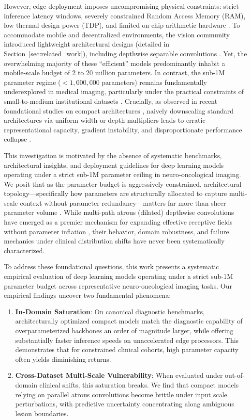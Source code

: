 However, edge deployment imposes uncompromising physical constraints: strict inference latency windows, severely constrained Random Access Memory (RAM), low thermal design power (TDP), and limited on-chip arithmetic hardware \cite{9, 25}. To accommodate mobile and decentralized environments, the vision community introduced lightweight architectural designs \cite{22} (detailed in Section~\ref{sec:related_work}), including depthwise separable convolutions \cite{11, 27}. Yet, the overwhelming majority of these ``efficient'' models predominantly inhabit a mobile-scale budget of 2 to 20 million parameters. In contrast, the sub-1M parameter regime ($<1,000,000$ parameters) remains fundamentally underexplored in medical imaging, particularly under the practical constraints of small-to-medium institutional datasets \cite{3, 16}. Crucially, as observed in recent foundational studies on compact architectures \cite{16}, naively downscaling standard architectures via uniform width or depth multipliers leads to erratic representational capacity, gradient instability, and disproportionate performance collapse \cite{16, 19}.

This investigation is motivated by the absence of systematic benchmarks, architectural insights, and deployment guidelines for deep learning models operating under a strict sub-1M parameter ceiling in neuro-oncological imaging. We posit that as the parameter budget is aggressively constrained, architectural topology---specifically how parameters are structurally allocated to capture multi-scale context without parameter redundancy---matters far more than sheer parameter volume \cite{16}. While multi-path atrous (dilated) depthwise convolutions have emerged as a premier mechanism for expanding effective receptive fields without parameter inflation \cite{5, 16}, their behavior, domain robustness, and failure mechanics under clinical distribution shifts have never been systematically characterized.

To address these foundational questions, this work presents a systematic empirical evaluation of deep learning models operating under a strict sub-1M parameter budget across representative neuro-oncological imaging tasks. Our empirical findings uncover two fundamental phenomena:
\begin{enumerate}
\item \textbf{In-Domain Saturation}: On canonical diagnostic benchmarks, architecturally optimized compact models match the diagnostic capability of overparameterized backbones an order of magnitude larger, while offering substantially faster inference speeds on unaccelerated edge processors. This demonstrates that for constrained clinical cohorts, high parameter capacity often yields diminishing returns.
\item \textbf{Cross-Dataset Multi-Scale Vulnerability}: When evaluated under out-of-domain clinical shifts, this saturation breaks. We find that compact models relying on parallel atrous convolutions become brittle under input scale perturbations, with predictive uncertainty concentrating along ambiguous lesion boundaries.
\end{enumerate}

